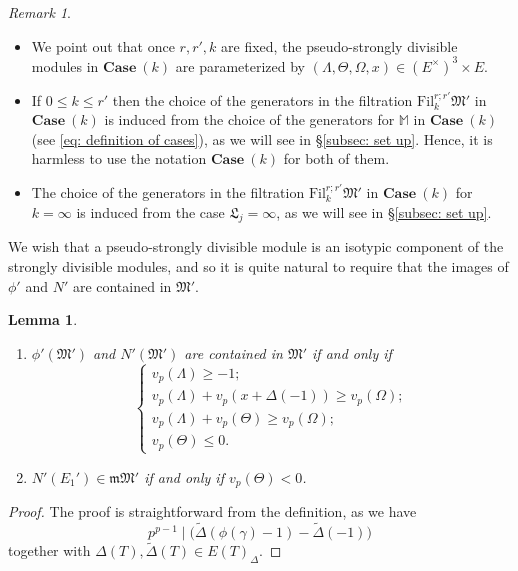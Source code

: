 \documentclass[11pt]{amsart}
\theoremstyle{definition}
\numberwithin{equation}{subsection}
\theoremstyle{plain}
\theoremstyle{plain}
\theoremstyle{plain}
\theoremstyle{plain}
\theoremstyle{plain}
\theoremstyle{plain}
\theoremstyle{plain}
\theoremstyle{plain}
\theoremstyle{plain}
\newtheorem{lemm}[equation]{Lemma}
\theoremstyle{plain}
\theoremstyle{plain}
\theoremstyle{plain}
\theoremstyle{definition}
\theoremstyle{definition}
\theoremstyle{definition}
\theoremstyle{remark}
\newtheorem{rema}[equation]{Remark}
\renewcommand{\(}{\textup{(}}
\renewcommand{\)}{\textup{)}}
\newcommand{\fM}{\mathfrak{M}}
\newcommand{\fL}{\mathfrak{L}}
\newcommand{\fm}{\mathfrak{m}}
\newcommand{\Fil}{\mathrm{Fil}}
\begin{document}
\begin{rema}
\begin{itemize}[leftmargin=*]
\item We point out that once $r,r',k$ are fixed, the pseudo-strongly divisible modules in $\mathbf{Case}~(k)$ are parameterized by $(\Lambda,\Theta,\Omega,x)\in (E^{\times})^3\times E$.
\item If $0\leq k\leq r'$ then the choice of the generators in the filtration $\Fil^{r;r'}_k\fM'$ in $\mathbf{Case}~(k)$ is induced from the choice of the generators for $\mathbb{M}$ in $\mathbf{Case}~(k)$ (see \eqref{eq: definition of cases}), as we will see in \S\ref{subsec: set up}. Hence, it is harmless to use the notation $\mathbf{Case}~(k)$ for both of them.
\item The choice of the generators in the filtration $\Fil^{r;r'}_k\fM'$ in $\mathbf{Case}~(k)$ for $k=\infty$ is induced from the case $\fL_j=\infty$, as we will see in \S\ref{subsec: set up}.
\end{itemize}
\end{rema}

We wish that a pseudo-strongly divisible module is an isotypic component of the strongly divisible modules, and so it is quite natural to require that the images of $\phi'$ and $N'$ are contained in $\fM'$.

\begin{lemm}\label{lemm: pseudo, condition for phi,N stable}
\begin{enumerate}[leftmargin=*]
\item $\phi'(\fM')$ and $N'(\fM')$ are contained in $\fM'$ if and only if 
\begin{equation}\label{eq: condition for phi,N stable}
\begin{cases}
v_p(\Lambda)\geq -1;\\
v_p(\Lambda)+v_p(x+\Delta(-1))\geq v_p(\Omega);\\
v_p(\Lambda)+v_p(\Theta)\geq v_p(\Omega);\\
v_p(\Theta)\leq 0.
\end{cases}
\end{equation}
\item $N'(E_1')\in \fm\fM'$ if and only if $v_p(\Theta)<0$.
\end{enumerate}
\end{lemm}

\begin{proof}
The proof is straightforward from the definition, as we have
\begin{equation}\label{eq: p^p-1 divides phi(gamma)}
p^{p-1}\mid \big(\tilde\Delta(\phi(\gamma)-1)-\tilde\Delta(-1)\big)
\end{equation}
together with $\Delta(T),\tilde{\Delta}(T)\in  E(T)_\Delta$.
\end{proof}
\end{document}
